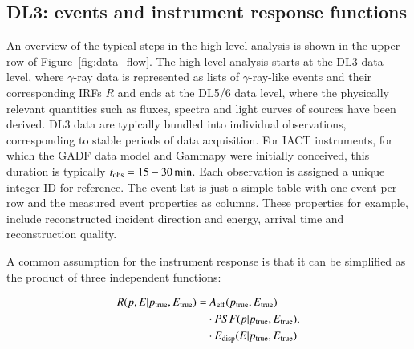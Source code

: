 \documentclass[longauth]{aa}
\newcommand{\gammapy}{Gammapy\xspace}
\newcommand{\gammaray}{$\gamma$-ray\xspace}
\newcommand{\gadf}{GADF\xspace}
\begin{document}
\subsection{DL3: events and instrument response functions}
An overview of the typical steps in the high level analysis is shown in the upper
row of Figure~\ref{fig:data_flow}. The high level analysis starts at the DL3 
data level, where \gammaray data is represented as lists of \gammaray-like events and their
corresponding IRFs $R$ and ends at the DL5/6 data level, where the physically relevant 
quantities such as fluxes, spectra and light curves of sources have been derived. DL3 data are typically 
bundled into individual observations, corresponding to
stable periods of data acquisition. For IACT instruments, for which the \gadf
data model and \gammapy were initially conceived, this duration is typically 
$t_{\rm obs}=15 - 30\,{\rm min}$. Each observation is assigned a unique integer ID for reference.
The event list is just a simple table with one event per row and
the measured event properties as columns. These properties for example, include reconstructed
incident direction and energy, arrival time and reconstruction quality.

A common assumption for the instrument response is that it can be simplified as the product 
of three independent functions:

\begin{equation}
        \begin{split}
   R(p, E|p_{\rm true}, E_{\rm true}) = &~A_{\rm eff}(p_{\rm true}, E_{\rm true}) \\
        & \cdot PSF(p|p_{\rm true}, E_{\rm true})\\
    & \cdot E_{\rm disp}(E|p_{\rm true}, E_{\rm true})
        \end{split}
,\end{equation}
\end{document}

